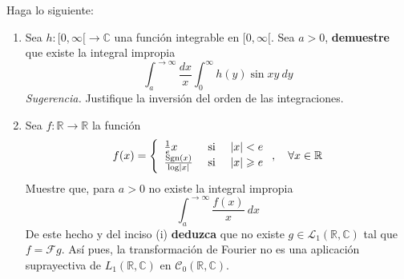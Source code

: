 \documentclass[12pt]{report}
\theoremstyle{largebreak}
\renewcommand{\geq}{\ensuremath{\geqslant}}
\newcommand\abs[1]{\ensuremath{\left|#1\right|}}
\newcommand\cf[3]{\ensuremath{#1:#2\rightarrow#3}}
\newcommand{\fou}[1]{\ensuremath{\mathcal{F}#1}}
\newcommand{\Sgn}[1]{\ensuremath{\textup{Sgn}\left(#1\right)}}
\begin{document}
    \begin{excer}
        Haga lo siguiente:
        \begin{enumerate}
            \item Sea $\cf{h}{[0,\infty[}{\mathbb{C}}$ una función integrable en $[0,\infty[$. Sea $a>0$, \textbf{demuestre} que existe la integral impropia
            \begin{equation*}
                \int_{a}^{ \rightarrow\infty}\frac{dx}{x}\int_0^{\infty}h(y)\sin xy\:dy
            \end{equation*}
            \textit{Sugerencia.} Justifique la inversión del orden de las integraciones.
            \item Sea $\cf{f}{\mathbb{R}}{\mathbb{R}}$ la función
            \begin{equation*}
                f(x)=\left\{
                    \begin{array}{lcr}
                        \frac{1}{e}x & \textup{ si } & \abs{x}<e\\
                        \frac{\Sgn{x}}{\log\abs{x}} & \textup{ si } & \abs{x}\geq e\\
                    \end{array}
                \right.,\quad\forall x\in\mathbb{R}
            \end{equation*}
            Muestre que, para $a>0$ no existe la integral impropia
            \begin{equation*}
                \int_a^{\rightarrow \infty}\frac{f(x)}{x}\:dx
            \end{equation*}
            De este hecho y del inciso (i) \textbf{deduzca} que no existe $g\in\mathcal{L}_1(\mathbb{R},\mathbb{C})$ tal que $f=\fou{g}$. Así pues, la transformación de Fourier no es una aplicación suprayectiva de $L_1(\mathbb{R},\mathbb{C})$ en $\mathcal{C}_0(\mathbb{R},\mathbb{C})$.
        \end{enumerate}
    \end{excer}
\end{document}
